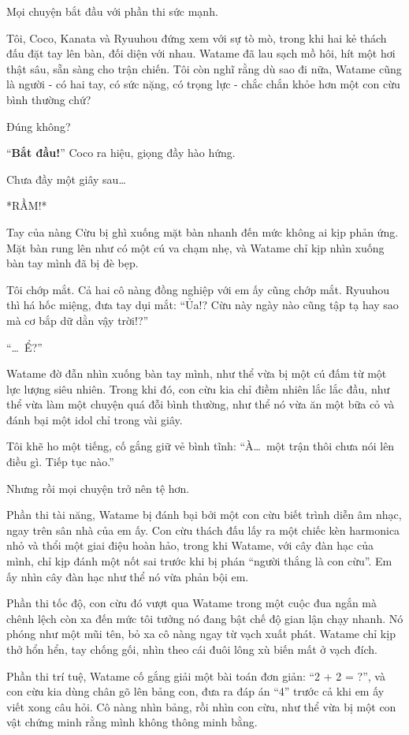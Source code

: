 \documentclass[../main.tex]{subfiles}
\begin{document}
Mọi chuyện bắt đầu với phần thi sức mạnh.

Tôi, Coco, Kanata và Ryuuhou đứng xem với sự tò mò, trong khi hai kẻ thách đấu đặt tay lên bàn, đối diện với nhau. Watame đã lau sạch mồ hôi, hít một hơi thật sâu, sẵn sàng cho trận chiến. Tôi còn nghĩ rằng dù sao đi nữa, Watame cũng là người - có hai tay, có sức nặng, có trọng lực - chắc chắn khỏe hơn một con cừu bình thường chứ?

Đúng không?

``\textbf{Bắt đầu!}'' Coco ra hiệu, giọng đầy hào hứng.

Chưa đầy một giây sau\dots

*RẦM!*

Tay của nàng Cừu bị ghì xuống mặt bàn nhanh đến mức không ai kịp phản ứng. Mặt bàn rung lên như có một cú va chạm nhẹ, và Watame chỉ kịp nhìn xuống bàn tay mình đã bị đè bẹp.

Tôi chớp mắt. Cả hai cô nàng đồng nghiệp với em ấy cũng chớp mắt. Ryuuhou thì há hốc miệng, đưa tay dụi mắt: ``Ủa!? Cừu này ngày nào cũng tập tạ hay sao mà cơ bắp dữ dằn vậy trời!?''

``\dots\ Ể?''

Watame đờ đẫn nhìn xuống bàn tay mình, như thể vừa bị một cú đấm từ một lực lượng siêu nhiên. Trong khi đó, con cừu kia chỉ điềm nhiên lắc lắc đầu, như thể vừa làm một chuyện quá đỗi bình thường, như thể nó vừa ăn một bữa cỏ và đánh bại một idol chỉ trong vài giây.

Tôi khẽ ho một tiếng, cố gắng giữ vẻ bình tĩnh: ``À\dots\ một trận thôi chưa nói lên điều gì. Tiếp tục nào.''

Nhưng rồi mọi chuyện trở nên tệ hơn.

Phần thi tài năng, Watame bị đánh bại bởi một con cừu biết trình diễn âm nhạc, ngay trên sân nhà của em ấy. Con cừu thách đấu lấy ra một chiếc kèn harmonica nhỏ và thổi một giai điệu hoàn hảo, trong khi Watame, với cây đàn hạc của mình, chỉ kịp đánh một nốt sai trước khi bị phán ``người thắng là con cừu''. Em ấy nhìn cây đàn hạc như thể nó vừa phản bội em.

Phần thi tốc độ, con cừu đó vượt qua Watame trong một cuộc đua ngắn mà chênh lệch còn xa đến mức tôi tưởng nó đang bật chế độ gian lận chạy nhanh. Nó phóng như một mũi tên, bỏ xa cô nàng ngay từ vạch xuất phát. Watame chỉ kịp thở hổn hển, tay chống gối, nhìn theo cái đuôi lông xù biến mất ở vạch đích.

Phần thi trí tuệ, Watame cố gắng giải một bài toán đơn giản: ``2 + 2 = ?'', và con cừu kia dùng chân gõ lên bảng con, đưa ra đáp án ``4'' trước cả khi em ấy viết xong câu hỏi. Cô nàng nhìn bảng, rồi nhìn con cừu, như thể vừa bị một con vật chứng minh rằng mình không thông minh bằng.
\end{document}
